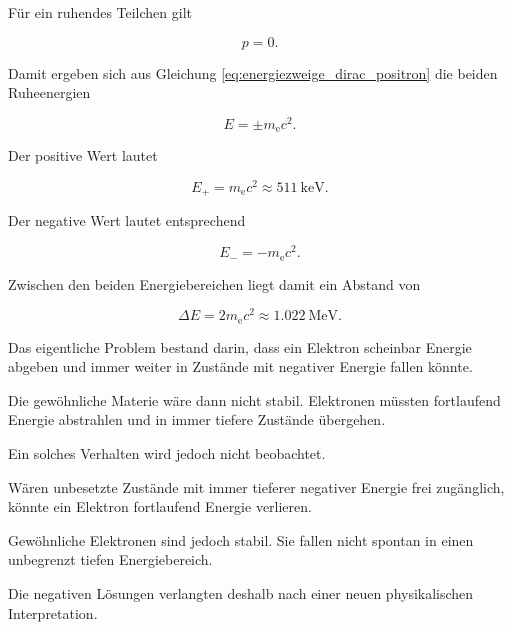 Für ein ruhendes Teilchen gilt

\begin{equation}
	p
	=
	0.
\end{equation}

Damit ergeben sich aus Gleichung
\eqref{eq:energiezweige_dirac_positron} die beiden Ruheenergien

\begin{equation}
	E
	=
	\pm m_{\mathrm e}c^2.
	\label{eq:positive_negative_ruheenergie}
\end{equation}

Der positive Wert lautet

\begin{equation}
	E_{+}
	=
	m_{\mathrm e}c^2
	\approx
	\SI{511}{\kilo\electronvolt}.
\end{equation}

Der negative Wert lautet entsprechend

\begin{equation}
	E_{-}
	=
	-m_{\mathrm e}c^2.
\end{equation}

Zwischen den beiden Energiebereichen liegt damit ein Abstand von

\begin{equation}
	\Delta E
	=
	2m_{\mathrm e}c^2
	\approx
	\SI{1.022}{\mega\electronvolt}.
	\label{eq:energieluecke_elektron_positron}
\end{equation}

Das eigentliche Problem bestand darin, dass ein Elektron scheinbar
Energie abgeben und immer weiter in Zustände mit negativer Energie
fallen könnte.

Die gewöhnliche Materie wäre dann nicht stabil. Elektronen müssten
fortlaufend Energie abstrahlen und in immer tiefere Zustände
übergehen.

Ein solches Verhalten wird jedoch nicht beobachtet.

\begin{DidacticBox}
	\label{box:problem_negative_energie}
	
	Wären unbesetzte Zustände mit immer tieferer negativer Energie frei
	zugänglich, könnte ein Elektron fortlaufend Energie verlieren.
	
	Gewöhnliche Elektronen sind jedoch stabil. Sie fallen nicht spontan in
	einen unbegrenzt tiefen Energiebereich.
	
	Die negativen Lösungen verlangten deshalb nach einer neuen
	physikalischen Interpretation.
\end{DidacticBox}

